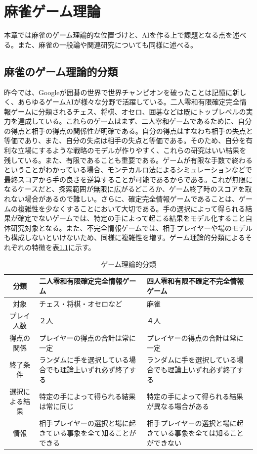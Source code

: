 \chapter{麻雀ゲーム理論}
\label{chap:relevantstudy}

本章では麻雀のゲーム理論的な位置づけと、AIを作る上で課題となる点を述べる。また、麻雀の一般論や関連研究についても同様に述べる。

\section{麻雀のゲーム理論的分類}
昨今では、Googleが囲碁の世界で世界チャンピオンを破ったことは記憶に新しく\cite{go}、あらゆるゲームAIが様々な分野で活躍している。二人零和有限確定完全情報ゲームに分類されるチェス、将棋、オセロ、囲碁などは既にトップレベルの実力を達成している。これらのゲームはまず、二人零和ゲームであるために、自分の得点と相手の得点の関係性が明確である。自分の得点はすなわち相手の失点と等価であり、また、自分の失点は相手の失点と等価である。そのため、自分を有利な立場にするような戦略のモデルが作りやすく、これらの研究はいい結果を残している。また、有限であることも重要である。ゲームが有限な手数で終わるということがわかっている場合、モンテカルロ法によるシミュレーションなどで最終スコアから手の良さを逆算することが可能であるからである。これが無限になるケースだと、探索範囲が無限に広がるどころか、ゲーム終了時のスコアを取れない場合があるので難しい。さらに、確定完全情報ゲームであることは、ゲームの複雑性を少なくすることにおいて大切である。手の選択によって得られる結果が確定でないゲームでは、特定の手によって起こる結果をモデル化すること自体研究対象となる。また、不完全情報ゲームでは、相手プレイヤーや場のモデルも構成しないといけないため、同様に複雑性を増す。ゲーム理論的分類によるそれぞれの特徴を表\ref{game}に示す。


\begin{table}[H]
  \caption{ゲーム理論的分類}
  \label{game}
  \begin{center}
  \begin{tabular}{c|p{5.75cm}|p{6.25cm}}
    \hline
    分類 & 二人零和有限確定完全情報ゲーム &  四人零和有限不確定不完全情報ゲーム \\\hline\hline
    対象 & チェス・将棋・オセロなど & 麻雀 \\\hline
    プレイ人数  & ２人 & ４人 \\\hline
    得点の関係 & プレイヤーの得点の合計は常に一定 & プレイヤーの得点の合計は常に一定 \\\hline
    終了条件 & ランダムに手を選択している場合でも理論上いずれ必ず終了する & ランダムに手を選択している場合でも理論上いずれ必ず終了する\\\hline
    選択による結果 & 特定の手によって得られる結果は常に同じ & 特定の手によって得られる結果が異なる場合がある\\\hline
    情報 & 相手プレイヤーの選択と場に起きている事象を全て知ることができる & 相手プレイヤーの選択と場に起きている事象を全ては知ることができない\\\hline
  \end{tabular}\end{center}
\end{table}


